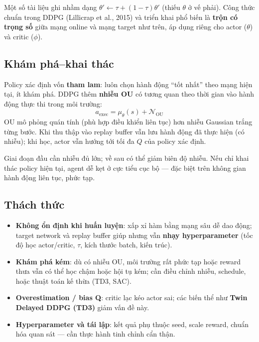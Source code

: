 \begin{luuy}[title={Công thức soft update}]
Một số tài liệu ghi nhầm dạng $\theta' \leftarrow \tau + (1-\tau)\theta'$ (thiếu $\theta$ ở vế phải). Công thức chuẩn trong DDPG (Lillicrap et al., 2015) và triển khai phổ biến là \textbf{trộn có trọng số} giữa mạng online và mạng target như trên, áp dụng riêng cho actor ($\theta$) và critic ($\phi$).
\end{luuy}

\subsection{Khám phá--khai thác}

\begin{phuongphap}[title={Nhiễu Ornstein--Uhlenbeck (OU)}]
Policy xác định vốn \textbf{tham lam}: luôn chọn hành động ``tốt nhất'' theo mạng hiện tại, ít khám phá. DDPG thêm \textbf{nhiễu OU} có tương quan theo thời gian vào hành động thực thi trong môi trường:
\[
a_{\text{exec}} = \mu_\theta(s) + \mathcal{N}_{\text{OU}}
\]
OU mô phỏng quán tính (phù hợp điều khiển liên tục) hơn nhiễu Gaussian trắng từng bước. Khi thu thập vào replay buffer vẫn lưu hành động đã thực hiện (có nhiễu); khi học, actor vẫn hướng tới tối đa $Q$ của policy xác định.
\end{phuongphap}

\begin{luuy}[title={Exploration vs.\ exploitation}]
Giai đoạn đầu cần nhiễu đủ lớn; về sau có thể giảm biên độ nhiễu. Nếu chỉ khai thác policy hiện tại, agent dễ kẹt ở cực tiểu cục bộ --- đặc biệt trên không gian hành động liên tục, phức tạp.
\end{luuy}

\subsection{Thách thức}

\begin{luuy}[title={Thách thức chính của DDPG}]
\begin{itemize}
  \item \textbf{Không ổn định khi huấn luyện}: xấp xỉ hàm bằng mạng sâu dễ dao động; target network và replay buffer giúp nhưng vẫn \textbf{nhạy hyperparameter} (tốc độ học actor/critic, $\tau$, kích thước batch, kiến trúc).
  \item \textbf{Khám phá kém}: dù có nhiễu OU, môi trường rất phức tạp hoặc reward thưa vẫn có thể học chậm hoặc hội tụ kém; cần điều chỉnh nhiễu, schedule, hoặc thuật toán kế thừa (TD3, SAC).
  \item \textbf{Overestimation / bias Q}: critic lạc kéo actor sai; các biến thể như \textbf{Twin Delayed DDPG (TD3)} giảm vấn đề này.
  \item \textbf{Hyperparameter và tái lập}: kết quả phụ thuộc seed, scale reward, chuẩn hóa quan sát --- cần thực hành tinh chỉnh cẩn thận.
\end{itemize}
\end{luuy}

